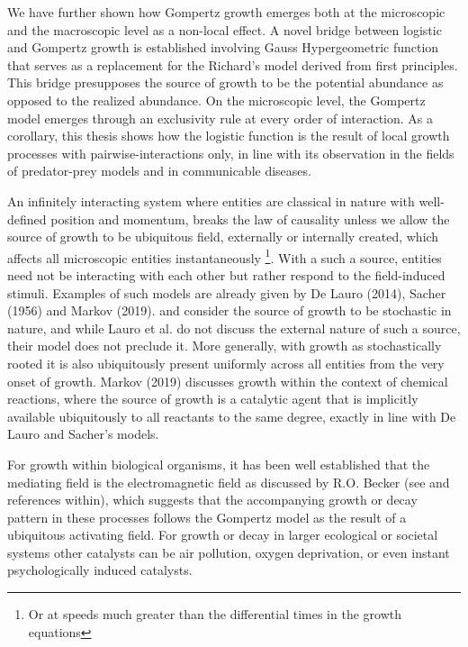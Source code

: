 \documentclass{article}
\begin{document}
We have further shown how Gompertz growth emerges both at the microscopic and the macroscopic level as a non-local effect. A novel bridge between logistic and Gompertz growth is established involving Gauss Hypergeometric function that serves as a replacement for the Richard's model derived from first principles. This bridge presupposes the source of growth to be the potential abundance as opposed to the realized abundance. On the microscopic level, the Gompertz model emerges through an exclusivity rule at every order of interaction. As a corollary, this thesis shows how the logistic function is the result of local growth processes with pairwise-interactions only, in line with its observation in the fields of predator-prey models and in communicable diseases. 

An infinitely interacting system where entities are classical in nature with well-defined position and momentum, breaks the law of causality unless we allow the source of growth to be ubiquitous field, externally or internally created, which affects all microscopic entities instantaneously \footnote{Or at speeds much greater than the differential times in the growth equations}. With a such a source, entities need not be interacting with each other but rather respond to the field-induced stimuli. Examples of such models are already given by De Lauro (2014), Sacher (1956) and Markov (2019). \citet{de2014stochastic} and \citet{sacher1956statistical} consider the source of growth to be stochastic in nature, and while Lauro et al. do not discuss the external nature of such a source, their model does not preclude it. More generally, with growth as stochastically rooted it is also ubiquitously present uniformly across all entities from the very onset of growth. Markov (2019)\cite{markov2019reaction} discusses growth within the context of chemical reactions, where the source of growth is a catalytic agent that is implicitly available ubiquitously to all reactants to the same degree, exactly in line with De Lauro and Sacher's models. 

For growth within biological organisms, it has been well established that the mediating field is the electromagnetic field as discussed by R.O. Becker (see \citet{becker1984electromagnetic} and references within), which suggests that the accompanying growth or decay pattern in these processes follows the Gompertz model as the result of a ubiquitous activating field. For growth or decay in larger ecological or societal systems other catalysts can be air pollution, oxygen deprivation, or even instant psychologically induced catalysts. 
\end{document}
